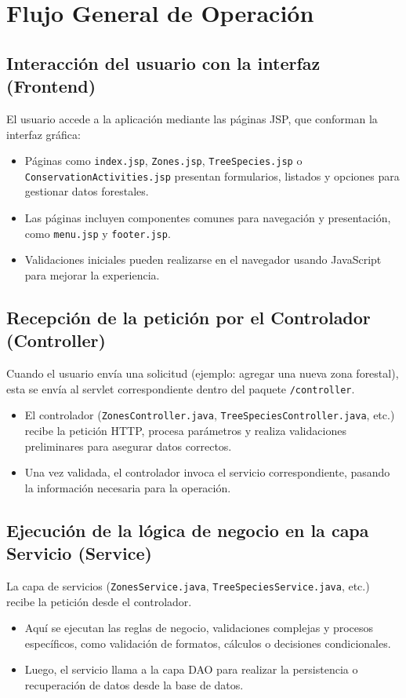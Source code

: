 \section{Flujo General de Operación}
\subsection{Interacción del usuario con la interfaz (Frontend)}
El usuario accede a la aplicación mediante las páginas JSP, que conforman la interfaz gráfica:
\begin{itemize}
    \item Páginas como \texttt{index.jsp}, \texttt{Zones.jsp}, \texttt{TreeSpecies.jsp} o \texttt{ConservationActivities.jsp} presentan formularios, listados y opciones para gestionar datos forestales.
    \item Las páginas incluyen componentes comunes para navegación y presentación, como \texttt{menu.jsp} y \texttt{footer.jsp}.
    \item Validaciones iniciales pueden realizarse en el navegador usando JavaScript para mejorar la experiencia.
\end{itemize}

\subsection{Recepción de la petición por el Controlador (Controller)}
Cuando el usuario envía una solicitud (ejemplo: agregar una nueva zona forestal), esta se envía al servlet correspondiente dentro del paquete \texttt{/controller}.
\begin{itemize}
    \item El controlador (\texttt{ZonesController.java}, \texttt{TreeSpeciesController.java}, etc.) recibe la petición HTTP, procesa parámetros y realiza validaciones preliminares para asegurar datos correctos.
    \item Una vez validada, el controlador invoca el servicio correspondiente, pasando la información necesaria para la operación.
\end{itemize}

\subsection{Ejecución de la lógica de negocio en la capa Servicio (Service)}
La capa de servicios (\texttt{ZonesService.java}, \texttt{TreeSpeciesService.java}, etc.) recibe la petición desde el controlador.
\begin{itemize}
    \item Aquí se ejecutan las reglas de negocio, validaciones complejas y procesos específicos, como validación de formatos, cálculos o decisiones condicionales.
    \item Luego, el servicio llama a la capa DAO para realizar la persistencia o recuperación de datos desde la base de datos.
\end{itemize}

